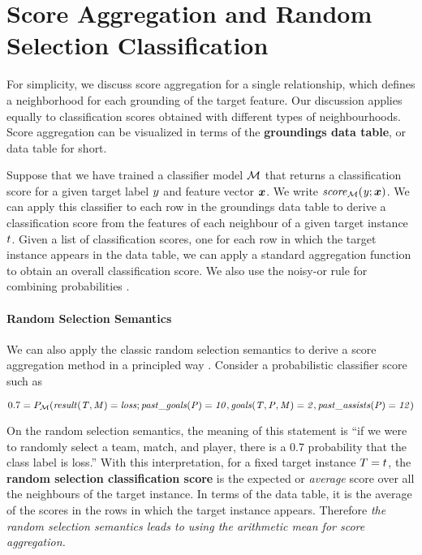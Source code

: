 \documentclass[oribibl]{llncs}%
\newcommand{\team}{T}
\newcommand{\player}{P}
\newcommand{\match}{M}
\begin{document}
\section{Score Aggregation and Random Selection Classification} For simplicity, we discuss score aggregation for a single relationship, which defines a neighborhood for each grounding of the target feature. Our discussion applies equally to classification scores obtained with different types of neighbourhoods. Score aggregation can be visualized in terms of the \textbf{groundings data table}, or data table for short. 

Suppose that we have trained a classifier model $\mathcal{M}$ that returns a classification score for a given target label $y$ and feature vector $\boldsymbol{x}$. We write $\it{score}_{\mathcal{M}}(y;\boldsymbol{x})$. We can apply this classifier to each row in the groundings data table to derive a classification score from the features of each neighbour of a given target instance $t$.
%
Given a list of classification scores, one for each row in which the target instance appears in the data table, we can apply a standard aggregation function to obtain an overall classification score. We also use the noisy-or rule for combining probabilities \cite{Kersting2007}.

%

\paragraph{Random Selection Semantics} We can also apply the classic random selection semantics to derive a score aggregation method in a principled way \cite{Halpern90,Bacchus90}. Consider a probabilistic classifier score such as 

$$0.7 = P_{\classifier}(\it{result}(\team,\match) = loss; \it{past\_goals}(\player) = 10, \it{goals}(\team, \player,\match)= 2, \it{past\_assists}(\player) = 12)$$

On the random selection semantics, the meaning of this statement is ``if we were to randomly select a team, match, and player, there is a 0.7 probability that the class label is loss.'' With this interpretation, for a fixed target instance $T = t$, the \textbf{random selection classification score}  is the expected or {\em average} score over all the neighbours of the target instance. In terms of the data table, it is the average of the scores in the rows in which the target instance appears. Therefore {\em the random selection semantics leads to using the arithmetic mean for score aggregation.} 
\end{document}
